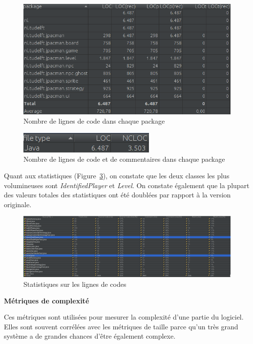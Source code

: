 \documentclass[12pt, openany]{report}
\begin{document}
\begin{figure}[!h]
	\centering
	\includegraphics[scale=0.6]{Images/SizeMetricsLOCFinal.png} 
	\caption{Nombre de lignes de code dans chaque package}
	\label{locfinal}
\end{figure}
\begin{figure}[!h]
	\centering
	\includegraphics[scale=0.6]{Images/SizeMetricsLOCFinal2.png} 
	\caption{Nombre de lignes de code et de commentaires dans chaque package}
	\label{locfinal2}
\end{figure}
\newpage
Quant aux statistiques (Figure~\ref{locfinal3}), on constate que les deux classes les plus volumineuses sont \mbox{\textit{IdentifiedPlayer}} et  \mbox{\textit{Level}}. On constate également que la plupart des valeurs totales des statistiques ont été doublées par rapport à la version originale.


\begin{figure}[!h]
	\centering
	\includegraphics[scale=0.29]{Images/SizeMetricsLOCFinal3.png} 
	\caption{Statistiques sur les lignes de codes}
	\label{locfinal3}
\end{figure}
\textbf{\large{Métriques de complexité}}

Ces métriques sont utilisées pour mesurer la complexité d’une partie du logiciel. Elles sont souvent corrélées avec les métriques de taille parce qu’un très grand système a de grandes chances d’être également complexe.\\
\end{document}
